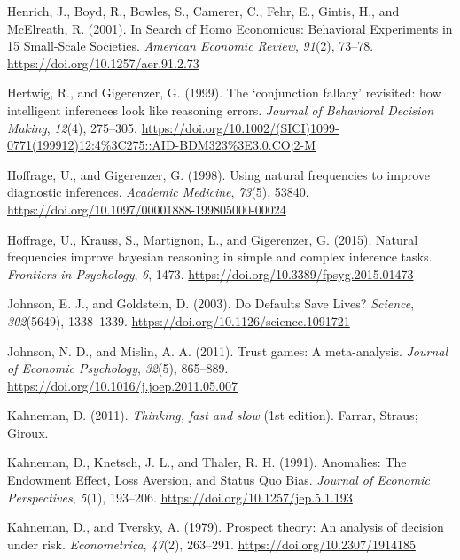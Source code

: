 \documentclass[
  letterpaper,
  DIV=11,
  numbers=noendperiod]{scrreprt}
\newlength{\cslhangindent}
\newlength{\cslentryspacingunit} %
\newenvironment{CSLReferences}[2] %
 {%
  \setlength{\parindent}{0pt}
  \ifodd #1
  \let\oldpar\par
  \def\par{\hangindent=\cslhangindent\oldpar}
  \fi
  \setlength{\parskip}{#2\cslentryspacingunit}
 }%
 {}
\begin{document}
\begin{CSLReferences}{1}{0}
\leavevmode{}%
Henrich, J., Boyd, R., Bowles, S., Camerer, C., Fehr, E., Gintis, H.,
and McElreath, R. (2001). In Search of Homo Economicus: Behavioral
Experiments in 15 Small-Scale Societies. \emph{American Economic
Review}, \emph{91}(2), 73--78. \url{https://doi.org/10.1257/aer.91.2.73}

\leavevmode{}%
Hertwig, R., and Gigerenzer, G. (1999). The {`}conjunction fallacy{'}
revisited: how intelligent inferences look like reasoning errors.
\emph{Journal of Behavioral Decision Making}, \emph{12}(4), 275--305.
\url{https://doi.org/10.1002/(SICI)1099-0771(199912)12:4\%3C275::AID-BDM323\%3E3.0.CO;2-M}

\leavevmode{}%
Hoffrage, U., and Gigerenzer, G. (1998). Using natural frequencies to
improve diagnostic inferences. \emph{Academic Medicine}, \emph{73}(5),
53840. \url{https://doi.org/10.1097/00001888-199805000-00024}

\leavevmode{}%
Hoffrage, U., Krauss, S., Martignon, L., and Gigerenzer, G. (2015).
Natural frequencies improve bayesian reasoning in simple and complex
inference tasks. \emph{Frontiers in Psychology}, \emph{6}, 1473.
\url{https://doi.org/10.3389/fpsyg.2015.01473}

\leavevmode{}%
Johnson, E. J., and Goldstein, D. (2003). Do Defaults Save Lives?
\emph{Science}, \emph{302}(5649), 1338--1339.
\url{https://doi.org/10.1126/science.1091721}

\leavevmode{}%
Johnson, N. D., and Mislin, A. A. (2011). Trust games: A meta-analysis.
\emph{Journal of Economic Psychology}, \emph{32}(5), 865--889.
\url{https://doi.org/10.1016/j.joep.2011.05.007}

\leavevmode{}%
Kahneman, D. (2011). \emph{Thinking, fast and slow} (1st edition).
Farrar, Straus; Giroux.

\leavevmode{}%
Kahneman, D., Knetsch, J. L., and Thaler, R. H. (1991). Anomalies: The
Endowment Effect, Loss Aversion, and Status Quo Bias. \emph{Journal of
Economic Perspectives}, \emph{5}(1), 193--206.
\url{https://doi.org/10.1257/jep.5.1.193}

\leavevmode{}%
Kahneman, D., and Tversky, A. (1979). Prospect theory: An analysis of
decision under risk. \emph{Econometrica}, \emph{47}(2), 263--291.
\url{https://doi.org/10.2307/1914185}


\end{CSLReferences}
\end{document}
